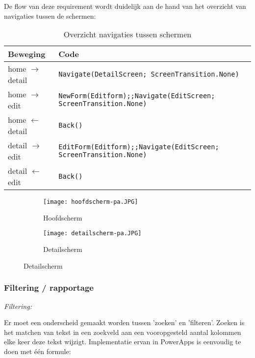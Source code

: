 De flow van deze requirement wordt duidelijk aan de hand van het overzicht van navigaties tussen de schermen:\\
\begin{table}[h!]
    \begin{tabular}{|l|l|}
        \hline
        \textbf{Beweging}         & \textbf{Code}                                                   \\ \hline
        home $\rightarrow$ detail & \lstinline|Navigate(DetailScreen; ScreenTransition.None)|                   \\ \hline
        home $\rightarrow$ edit   & \lstinline|NewForm(Editform);;Navigate(EditScreen; ScreenTransition.None)|  \\ \hline
        home $\leftarrow$ detail  & \lstinline|Back()|                                                          \\ \hline
        detail $\rightarrow$ edit & \lstinline|EditForm(Editform);;Navigate(EditScreen; ScreenTransition.None)| \\ \hline
        detail $\leftarrow$ edit  & \lstinline|Back()|                                                          \\ \hline
    \end{tabular}
    \caption{Overzicht navigaties tussen schermen}
    \label{tab:app-flow}
\end{table}

\begin{figure}[h!]
    \centering
    \begin{subfigure}[b]{\linewidth}
        \texttt{[image: hoofdscherm-pa.JPG]}
        \caption{Hoofdscherm}
    \end{subfigure}
    \begin{subfigure}[b]{\linewidth}
        \texttt{[image: detailscherm-pa.JPG]}
        \caption{Detailscherm}
    \end{subfigure}
    \label{fig:hoofd-detail-pa}
\end{figure}

\subsubsection{Filtering / rapportage}

\textit{Filtering:}

Er moet een onderscheid gemaakt worden tussen 'zoeken' en 'filteren'. Zoeken is het matchen van tekst in een zoekveld aan een vooropgesteld aantal kolommen elke keer deze tekst wijzigt. Implementatie ervan in PowerApps is eenvoudig te doen met één formule:

